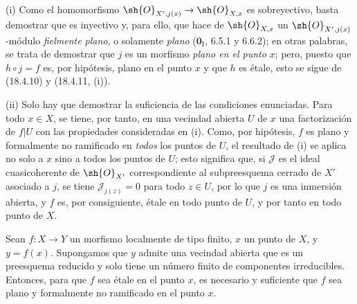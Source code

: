 (i) Como el homomorfismo $\sh{O}_{X',j(x)}\to\sh{O}_{X,x}$ es sobreyectivo, basta demostrar que es inyectivo y, para ello, que hace de $\sh{O}_{X,x}$ un $\sh{O}_{X',j(x)}$-módulo \emph{fielmente plano}, o solamente \emph{plano} ($\mathbf{0}_{\mathrm I}$, 6.5.1 y 6.6.2); en otras palabras, se trata de demostrar que $j$ es un morfismo \emph{plano en el punto} $x$; pero, puesto que $h\circ j=f$ es, por hipótesis, plano en el punto $x$ y que $h$ es étale, esto se sigue de (18.4.10) y (18.4.11, (i)).

(ii) Solo hay que demostrar la suficiencia de las condiciones enunciadas. Para todo $x\in X$, se tiene, por tanto, en una vecindad abierta $U$ de $x$ una factorización de $f|U$ con las propiedades consideradas en (i). Como, por hipótesis, $f$ es plano y formalmente no ramificado en \emph{todos} los puntos de $U$, el resultado de (i) se aplica no solo a $x$ sino a todos los puntos de $U$; esto significa que, si $\mathscr J$ es el ideal cuasicoherente de $\sh{O}_{X'}$ correspondiente al subpreesquema cerrado de $X'$ asociado a $j$, se tiene $\mathscr J_{j(z)}=0$ para todo $z\in U$, por lo que $j$ es una inmersión abierta, y $f$ es, por consiguiente, étale en todo punto de $U$, y por tanto en todo punto de $X$.

\begin{corollary}[18.4.13]
\label{IV.18.4.13}
Sean $f:X\to Y$ un morfismo localmente de tipo finito, $x$ un punto de $X$, y $y=f(x)$. Supongamos que $y$ admite una vecindad abierta que es un preesquema reducido y solo tiene un número finito de componentes irreducibles. Entonces, para que $f$ sea étale en el punto $x$, es necesario y suficiente que $f$ sea plano y formalmente no ramificado en el punto $x$.
\end{corollary}

